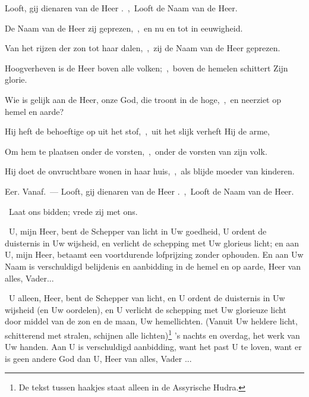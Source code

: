 \documentclass[12pt,twoside,a5paper]{article}
\begin{document}
\begin{halfparskip}
   Looft, gij dienaren van de Heer .~\sep\ Looft de Naam van de Heer.

   

  De Naam van de Heer zij geprezen,~\sep\ en nu en tot in eeuwigheid.

  Van het rijzen der zon tot haar dalen,~\sep\ zij de Naam van de Heer geprezen.

  Hoogverheven is de Heer boven alle volken;~\sep\ boven de hemelen schittert Zijn glorie.

  Wie is gelijk aan de Heer, onze God, die troont in de hoge,~\sep\ en neerziet op hemel en aarde?

  Hij heft de behoeftige op uit het stof,~\sep\ uit het slijk verheft Hij de arme,

  Om hem te plaatsen onder de vorsten,~\sep\ onder de vorsten van zijn volk.

  Hij doet de onvruchtbare wonen in haar huis,~\sep\ als blijde moeder van kinderen.

  Eer. Vanaf.~--- Looft, gij dienaren van de Heer .~\sep\ Looft de Naam van de Heer.

\end{halfparskip}

\begin{halfparskip}
  \dd~Laat ons bidden; vrede zij met ons.

   \cc~U, mijn Heer, bent de Schepper van licht in Uw goedheid, U ordent de duisternis in Uw wijsheid, en verlicht de schepping met Uw glorieus licht; en aan U, mijn Heer, betaamt een voortdurende lofprijzing zonder ophouden. En aan Uw Naam is verschuldigd belijdenis en aanbidding in de hemel en op aarde, Heer van alles, Vader...

   \cc~U alleen, Heer, bent de Schepper van licht, en U ordent de duisternis in Uw wijsheid (en Uw oordelen), en U verlicht de schepping met Uw glorieuze licht door middel van de zon en de maan, Uw hemellichten. (Vanuit Uw heldere licht, schitterend met stralen, schijnen alle lichten)\footnote{De tekst tussen haakjes staat alleen in de Assyrische Hudra.} 's nachts en overdag, het werk van Uw handen. Aan U is verschuldigd aanbidding, want het past U te loven, want er is geen andere God dan U, Heer van alles, Vader ...
\end{halfparskip}
\end{document}
